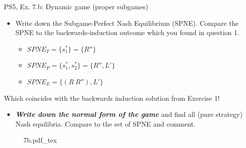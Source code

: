 \begin{frame}{PS5, Ex. 7.b: Dynamic game (proper subgames)}
  \begin{multicols}{2}
    \begin{itemize}
      \item[(b)] Write down the Subgame-Perfect Nash Equilibrium (SPNE). Compare the SPNE to the backwards-induction outcome which you found in question 1.
      \vspace{6pt}
      \begin{itemize}\normalsize
        \item[Turquoise game:] $SPNE_T=\{s_1^{*}\}=\{R''\}$
        \item[Purple game:] $SPNE_P=\{s_1^{*},s_2^{*}\}=\{R'',L'\}$
        \item[Entire game:] $SPNE_E=\{(R\ R''),L'\}$
      \end{itemize}
    \end{itemize}
    Which coincides with the backwards induction solution from Exercise 1!
    \begin{itemize}
      \item[(c)] \textbf{\textit{Write down the normal form of the game}} and find all (pure strategy) Nash equilibria. Compare to the set of SPNE and comment.
    \end{itemize}
    \vfill\null \columnbreak
    \begin{figure}[!h]
      \center
      \def\svgwidth{\columnwidth}
      {7b.pdf_tex}
    \end{figure}
    \vfill\null
  \end{multicols}
\end{frame}

